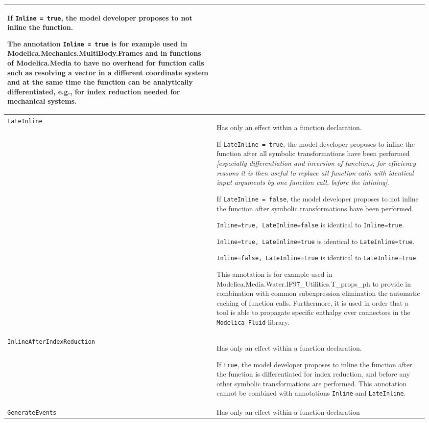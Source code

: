 \begin{longtable}[]{|p{4.2cm}|p{10cm}|}
If \lstinline!Inline = true!, the model developer proposes to not inline the
function.

\begin{nonnormative}
The annotation \lstinline!Inline = true! is for example used in
Modelica\allowbreak{}.Mechanics\allowbreak{}.MultiBody\allowbreak{}.Frames and in functions of
Modelica\allowbreak{}.Media to have no overhead for function calls such as
resolving a vector in a different coordinate system and at the same time
the function can be analytically differentiated, e.g., for index
reduction needed for mechanical systems.
\end{nonnormative}
\\ \hline
\lstinline!LateInline!
&
Has only an effect within a function declaration.

If \lstinline!LateInline = true!, the model developer proposes to inline the
function after all symbolic transformations have been performed
\emph{{[}especially differentiation and inversion of functions; for
efficiency reasons it is then useful to replace all function calls with
identical input arguments by one function call, before the inlining{]}}.

If \lstinline!LateInline = false!, the model developer proposes to not inline
the function after symbolic transformations have been performed.

\lstinline!Inline=true, LateInline=false! is identical to \lstinline!Inline=true!.

\lstinline!Inline=true, LateInline=true! is identical to \lstinline!LateInline=true!.

\lstinline!Inline=false, LateInline=true! is identical to \lstinline!LateInline=true!.

\begin{nonnormative}
This annotation is for example used in
Modelica\allowbreak{}.Media\allowbreak{}.Water\allowbreak{}.IF97\_Utilities\allowbreak{}.T\_props\_ph to provide in
combination with common subexpression elimination the automatic caching
of function calls. Furthermore, it is used in order that a tool is able
to propagate specific enthalpy over connectors in the \lstinline!Modelica_Fluid!
library.
\end{nonnormative}
\\ \hline
\lstinline!InlineAfterIndexReduction!\strut
&
Has only an effect within a function declaration.

If \lstinline!true!, the model developer proposes to inline the function after the
function is differentiated for index reduction, and before any other
symbolic transformations are performed. This annotation cannot be
combined with annotations \lstinline!Inline! and \lstinline!LateInline!.
\\ \hline
\lstinline!GenerateEvents!\strut
&
Has only an effect within a function declaration


\end{longtable}
